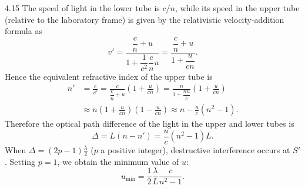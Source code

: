 \begin{solution}{4.15}
The speed of light in the lower tube is $c/n$, while its speed in the upper tube (relative to
the laboratory frame) is given by the relativistic velocity-addition formula as
\begin{equation*}
v' = \frac{\dfrac{c}{n}+u}{1+\dfrac{1}{c^2}\dfrac{c}{n}u}
   = \frac{\dfrac{c}{n}+u}{1+\dfrac{u}{cn}} .
\end{equation*}
Hence the equivalent refractive index of the upper tube is
\begin{align*}
n' &= \frac{c}{v'} = \frac{c}{\dfrac{c}{n}+u}
     \left(1+\frac{u}{cn}\right)
   = \frac{n}{1+\dfrac{nu}{c}}\left(1+\frac{u}{cn}\right)\\
   &\approx n\left(1+\frac{u}{cn}\right)\left(1-\frac{u}{cn}\right)
   \approx n-\frac{u}{c}(n^2-1).
\end{align*}
Therefore the optical path difference of the light in the upper and lower tubes is
\begin{equation*}
\Delta = L(n-n') = \frac{u}{c}(n^2-1)L .
\end{equation*}
When $\Delta = (2p-1)\frac{\lambda}{2}$ ($p$ a positive integer), destructive interference
occurs at $S'$. Setting $p=1$, we obtain the minimum value of $u$:
\begin{equation*}
u_{\min} = \frac{1}{2}\frac{\lambda}{L}\frac{c}{n^2-1} .
\end{equation*}
\end{solution}

